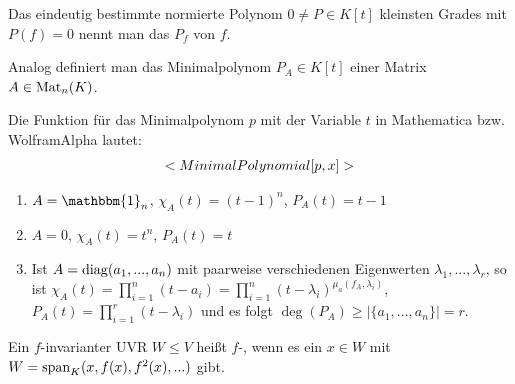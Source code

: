 \begin{definition}[Minimalpolynom]
	Das eindeutig bestimmte normierte Polynom $0\neq P\in K[t]$ kleinsten Grades mit $P(f)=0$ nennt man das  $P_f$ von $f$.
	
	Analog definiert man das Minimalpolynom $P_A\in K[t]$ einer Matrix $A\in\Mat_n(K)$.
\end{definition}

\begin{mathematica}[Minimalpolynom]
	Die Funktion für das Minimalpolynom $p$ mit der Variable $t$ in Mathematica bzw. WolframAlpha lautet:
	\begin{align}
		\texttt{MinimalPolynomial[p,x]}\notag
	\end{align}
\end{mathematica}

\begin{example}
	\begin{enumerate}
		\item $A=\mathbbm{1}_n$, $\chi_A(t)=(t-1)^n$, $P_A(t)=t-1$
		\item $A=0$, $\chi_A(t)=t^n$, $P_A(t)=t$
		\item Ist $A=\diag(a_1,...,a_n)$ mit paarweise verschiedenen Eigenwerten $\lambda_1,...,\lambda_r$, so ist $\chi_A(t)=\prod_{i=1}^n (t-a_i)=\prod_{i=1}^n (t-\lambda_i)^{\mu_a(f_A,\lambda_i)}$, $P_A(t)=\prod_{i=1}^r (t-\lambda_i)$ und es folgt $\deg(P_A)\ge \vert \{a_1,...,a_n\}\vert=r$.
	\end{enumerate}
\end{example}

\begin{definition}[$f$-zyklisch]
	Ein $f$-invarianter UVR $W\le V$ heißt $f$-, wenn es ein $x\in W$ mit $W=\Span_K(x,f(x),f^2(x),...)$ gibt.
\end{definition}

